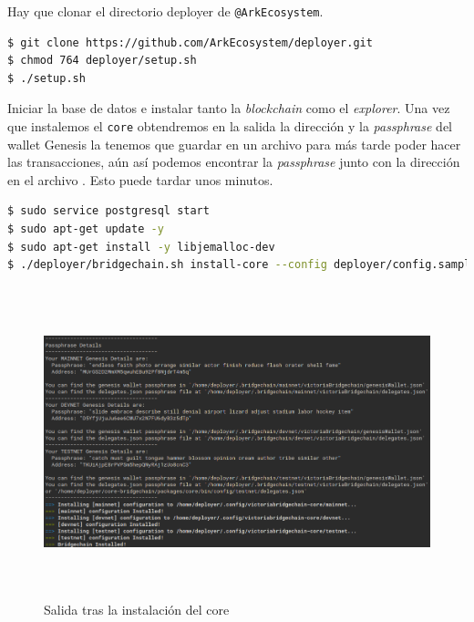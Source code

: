 Hay que clonar el directorio deployer de \texttt{@ArkEcosystem}.\\

\begin{lstlisting}[language=Bash,caption=Instalación \textit{blockchain}. Parte IX, label=cod:suma-cuerpo, style=Consola]
$ git clone https://github.com/ArkEcosystem/deployer.git
$ chmod 764 deployer/setup.sh
$ ./setup.sh
\end{lstlisting}

Iniciar la base de datos e instalar tanto la \textit{blockchain} como el \textit{explorer}. Una vez que instalemos el \texttt{core} obtendremos en la salida la dirección y la \textit{passphrase} del wallet Genesis la tenemos que guardar en un archivo para más tarde poder hacer las transacciones, aún así podemos encontrar la \textit{passphrase} junto con la dirección en el archivo . Esto puede tardar unos minutos.
\begin{lstlisting}[language=Bash,caption=Instalación \textit{blockchain}. Parte X, label=cod:suma-cuerpo, style=Consola]
$ sudo service postgresql start
$ sudo apt-get update -y 
$ sudo apt-get install -y libjemalloc-dev
$ ./deployer/bridgechain.sh install-core --config deployer/config.sample.conf --autoinstall-deps --non-interactive
\end{lstlisting}

\begin{figure}[h]
	\centering
	\includegraphics[width=15cm,height=9cm]{figuras/Instalacion_bridgechain.png}
	\caption{Salida tras la instalación del core}
	\label{fig:install-bridge}
\end{figure}

